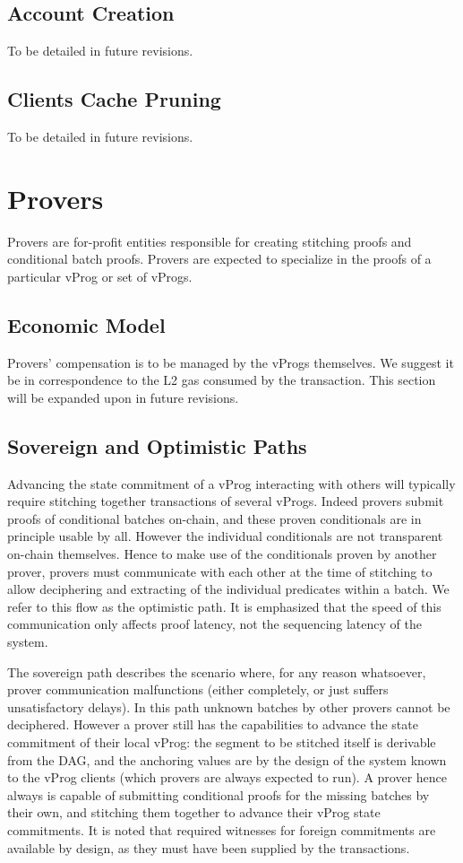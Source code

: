 \documentclass[onecolumn, 9pt, a4paper]{extarticle}
\begin{document}
\subsection{Account Creation}
To be detailed in future revisions.

\subsection{Clients Cache Pruning}
To be detailed in future revisions.

\section{Provers}
Provers are for-profit entities responsible for creating stitching proofs and conditional batch proofs. Provers are expected to specialize in the proofs of a particular vProg or set of vProgs.

\subsection{Economic Model}
Provers’ compensation is to be managed by the vProgs themselves. We suggest it be in correspondence to the L2 gas consumed by the transaction.
This section will be expanded upon in future revisions.

\subsection{Sovereign and Optimistic Paths}
Advancing the state commitment of a vProg interacting with others will typically require stitching together transactions of several vProgs. Indeed provers submit proofs of conditional batches on-chain, and these proven conditionals are in principle usable by all. However the individual conditionals are not transparent on-chain themselves. Hence to make use of the conditionals proven by another prover, provers must communicate with each other at the time of stitching to allow deciphering and extracting of the individual predicates within a batch. We refer to this flow as the optimistic path. It is emphasized that the speed of this communication only affects proof latency, not the sequencing latency of the system.

The sovereign path describes the scenario where, for any reason whatsoever, prover communication malfunctions (either completely, or just suffers unsatisfactory delays). In this path unknown batches by other provers cannot be deciphered. However a prover still has the capabilities to advance the state commitment of their local vProg: the segment to be stitched itself is derivable from the DAG, and the anchoring values are by the design of the system known to the vProg clients (which provers are always expected to run). A prover hence always is capable of submitting conditional proofs for the missing batches by their own, and stitching them together to advance their vProg state commitments. It is noted that required witnesses for foreign commitments are available by design,  as they must have been supplied by the transactions. 
\end{document}
